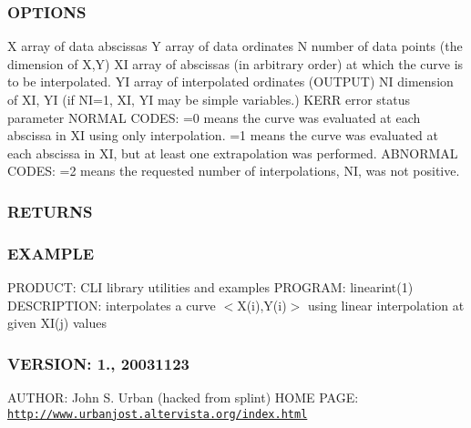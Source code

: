 \subsubsection*{O\+P\+T\+I\+O\+NS}

X array of data abscissas Y array of data ordinates N number of data points (the dimension of X,Y) XI array of abscissas (in arbitrary order) at which the curve is to be interpolated. YI array of interpolated ordinates (O\+U\+T\+P\+UT) NI dimension of XI, YI (if NI=1, XI, YI may be simple variables.) K\+E\+RR error status parameter N\+O\+R\+M\+AL C\+O\+D\+ES\+: =0 means the curve was evaluated at each abscissa in XI using only interpolation. =1 means the curve was evaluated at each abscissa in XI, but at least one extrapolation was performed. A\+B\+N\+O\+R\+M\+AL C\+O\+D\+ES\+: =2 means the requested number of interpolations, NI, was not positive. \subsubsection*{R\+E\+T\+U\+R\+NS}

\subsubsection*{E\+X\+A\+M\+P\+LE}

P\+R\+O\+D\+U\+CT\+: C\+LI library utilities and examples P\+R\+O\+G\+R\+AM\+: linearint(1) D\+E\+S\+C\+R\+I\+P\+T\+I\+ON\+: interpolates a curve $<$X(i),Y(i)$>$ using linear interpolation at given X\+I(j) values \subsubsection*{V\+E\+R\+S\+I\+ON\+: 1., 20031123}

A\+U\+T\+H\+OR\+: John S. Urban (hacked from splint) H\+O\+ME P\+A\+GE\+: \href{http://www.urbanjost.altervista.org/index.html}{\tt http\+://www.\+urbanjost.\+altervista.\+org/index.\+html} \mbox{\label{namespacem__math_ac5b38d6e45c30842b20c944bf2e88629}} 

